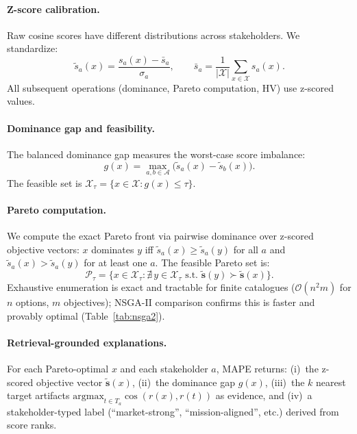 \documentclass[sigconf,review]{acmart}
\newcommand{\MAPE}{\textsc{MAPE}\xspace}
\begin{document}
\paragraph{Z-score calibration.}
Raw cosine scores have different distributions across stakeholders. We standardize:
\begin{equation}
  \tilde{s}_a(x) = \frac{s_a(x) - \bar{s}_a}{\sigma_a}, \qquad
  \bar{s}_a = \frac{1}{|\mathcal{X}|}\sum_{x\in\mathcal{X}} s_a(x).
\end{equation}
All subsequent operations (dominance, Pareto computation, HV) use z-scored values.

\paragraph{Dominance gap and feasibility.}
The balanced dominance gap measures the worst-case score imbalance:
\begin{equation}
  g(x) = \max_{a,b\in\mathcal{A}} \bigl(\tilde{s}_a(x) - \tilde{s}_b(x)\bigr).
\end{equation}
The feasible set is $\mathcal{X}_\tau = \{x\in\mathcal{X} : g(x)\le\tau\}$.

\paragraph{Pareto computation.}
We compute the exact Pareto front via pairwise dominance over z-scored objective vectors:
$x$ dominates $y$ iff $\tilde{s}_a(x)\ge\tilde{s}_a(y)$ for all $a$ and $\tilde{s}_a(x)>\tilde{s}_a(y)$ for at least one $a$. The feasible Pareto set is:
\begin{equation}
  \mathcal{P}_\tau = \{x\in\mathcal{X}_\tau : \nexists\, y\in\mathcal{X}_\tau \text{ s.t.\ } \mathbf{\tilde{s}}(y)\succ\mathbf{\tilde{s}}(x)\}.
\end{equation}
Exhaustive enumeration is exact and tractable for finite catalogues ($\mathcal{O}(n^2 m)$ for $n$ options, $m$ objectives); NSGA-II comparison confirms this is faster and provably optimal (Table~\ref{tab:nsga2}).

\paragraph{Retrieval-grounded explanations.}
For each Pareto-optimal $x$ and each stakeholder $a$, \MAPE returns:
(i)~the z-scored objective vector $\tilde{\mathbf{s}}(x)$,
(ii)~the dominance gap $g(x)$,
(iii)~the $k$ nearest target artifacts $\mathrm{argmax}_{t\in T_a} \cos(r(x), r(t))$ as evidence, and
(iv)~a stakeholder-typed label (``market-strong'', ``mission-aligned'', etc.) derived from score ranks.
\end{document}
